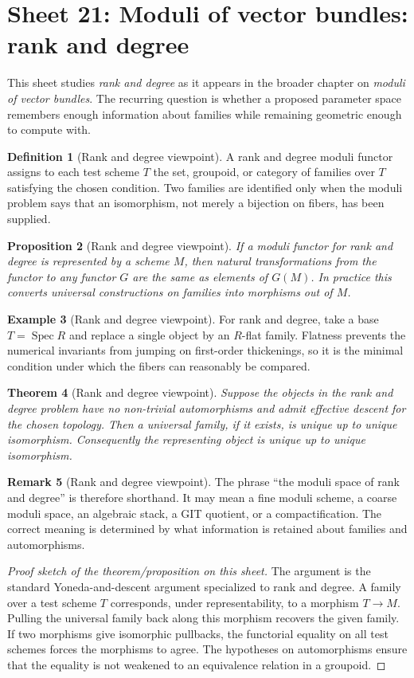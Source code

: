 \documentclass[11pt]{amsart}
\newtheorem{theorem}{Theorem}[section]
\newtheorem{proposition}[theorem]{Proposition}
\theoremstyle{definition}
\newtheorem{definition}[theorem]{Definition}
\newtheorem{example}[theorem]{Example}
\newtheorem{remark}[theorem]{Remark}
\newcommand{\Spec}{\operatorname{Spec}}
\begin{document}
\section{Sheet 21: Moduli of vector bundles: rank and degree}
This sheet studies \emph{rank and degree} as it appears in the broader chapter on \emph{moduli of vector bundles}.  The recurring question is whether a proposed parameter space remembers enough information about families while remaining geometric enough to compute with.
\begin{definition}[Rank and degree viewpoint]
A rank and degree moduli functor assigns to each test scheme $T$ the set, groupoid, or category of families over $T$ satisfying the chosen condition.  Two families are identified only when the moduli problem says that an isomorphism, not merely a bijection on fibers, has been supplied.
\end{definition}
\begin{proposition}[Rank and degree viewpoint]
If a moduli functor for rank and degree is represented by a scheme $M$, then natural transformations from the functor to any functor $G$ are the same as elements of $G(M)$.  In practice this converts universal constructions on families into morphisms out of $M$.
\end{proposition}
\begin{example}[Rank and degree viewpoint]
For rank and degree, take a base $T=\Spec R$ and replace a single object by an $R$-flat family.  Flatness prevents the numerical invariants from jumping on first-order thickenings, so it is the minimal condition under which the fibers can reasonably be compared.
\end{example}
\begin{theorem}[Rank and degree viewpoint]
Suppose the objects in the rank and degree problem have no non-trivial automorphisms and admit effective descent for the chosen topology.  Then a universal family, if it exists, is unique up to unique isomorphism.  Consequently the representing object is unique up to unique isomorphism.
\end{theorem}
\begin{remark}[Rank and degree viewpoint]
The phrase ``the moduli space of rank and degree'' is therefore shorthand.  It may mean a fine moduli scheme, a coarse moduli space, an algebraic stack, a GIT quotient, or a compactification.  The correct meaning is determined by what information is retained about families and automorphisms.
\end{remark}
\begin{proof}[Proof sketch of the theorem/proposition on this sheet]
The argument is the standard Yoneda-and-descent argument specialized to rank and degree.  A family over a test scheme $T$ corresponds, under representability, to a morphism $T\to M$.  Pulling the universal family back along this morphism recovers the given family.  If two morphisms give isomorphic pullbacks, the functorial equality on all test schemes forces the morphisms to agree.  The hypotheses on automorphisms ensure that the equality is not weakened to an equivalence relation in a groupoid.
\end{proof}
\end{document}
